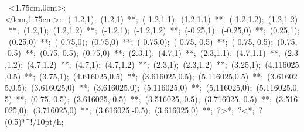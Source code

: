 

%
\hbox{
\xy    <1.75cm,0cm>:<0cm,1.75cm>::
       (-1.2,1); (1.2,1) **\dir{-};
       (-1.2,1.1); (1.2,1.1) **\dir{-};
       (-1.2,1.2); (1.2,1.2) **\dir{-};
       (1.2,1); (1.2,1.2) **\dir{-};
       (-1.2,1); (-1.2,1.2) **\dir{-};
	(-0.25,1); (-0.25,0) **\dir{-};
	(0.25,1); (0.25,0) **\dir{-};
	(-0.75,0); (0.75,0) **\dir{-};
	(-0.75,0); (-0.75,-0.5) **\dir{-};
	(-0.75,-0.5); (0.75,-0.5) **\dir{-};
	(0.75,-0.5); (0.75,0) **\dir{-};
	(2.3,1); (4.7,1) **\dir{-};
       (2.3,1.1); (4.7,1.1) **\dir{-};
       (2.3,1.2); (4.7,1.2) **\dir{-};
       (4.7,1); (4.7,1.2) **\dir{-};
       (2.3,1); (2.3,1.2) **\dir{-};
	(3.25,1); (4.116025,0.5) **\dir{-};
	(3.75,1); (4.616025,0.5) **\dir{-};
	(3.616025,0.5); (5.116025,0.5) **\dir{-};
	(3.616025,0.5); (3.616025,0) **\dir{-};
	(3.616025,0); (5.116025,0) **\dir{-};
	(5.116025,0); (5.116025,0.5) **\dir{-};
	(0.75,-0.5); (3.616025,-0.5) **\dir{--};
	(3.516025,-0.5); (3.716025,-0.5) **\dir{-};
	(3.516025,0); (3.716025,0) **\dir{-};
	(3.616025,-0.5); (3.616025,0) **\dir{-}; 
	?>*\dir{>}; ?<*\dir{<};
	?(0.5)*^!/10pt/\hbox{h};  
\endxy}







